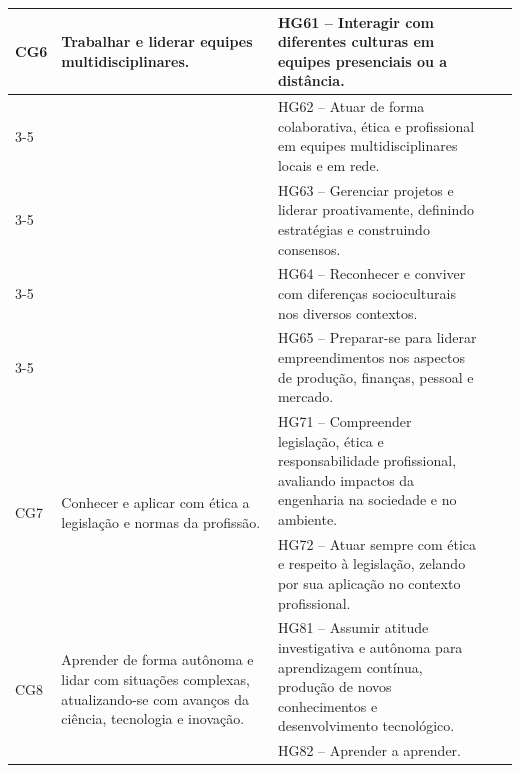 \begin{landscape}
\begin{longtable}{m{1cm} m{5cm} m{8cm} m{5cm} m{5cm}}
		
		\multirow{5}{*}{CG6} &
		\multirow{5}{5cm}{Trabalhar e liderar equipes multidisciplinares.}
		& HG61 – Interagir com diferentes culturas em equipes presenciais ou a distância.
		&
		&
		\\ \cline{3-5}
		
		&
		& HG62 – Atuar de forma colaborativa, ética e profissional em equipes multidisciplinares locais e em rede.
		&
		&
		\\ \cline{3-5}
		
		&
		& HG63 – Gerenciar projetos e liderar proativamente, definindo estratégias e construindo consensos.
		&
		&
		\\ \cline{3-5}
		
		&
		& HG64 – Reconhecer e conviver com diferenças socioculturais nos diversos contextos.
		&
		&
		\\ \cline{3-5}
		
		&
		& HG65 – Preparar-se para liderar empreendimentos nos aspectos de produção, finanças, pessoal e mercado.
		&
		&
		\\ \hline
		
		
		\multirow{2}{*}{CG7} &
		\multirow{2}{5cm}{Conhecer e aplicar com ética a legislação e normas da profissão.}
		& HG71 – Compreender legislação, ética e responsabilidade profissional, avaliando impactos da engenharia na sociedade e no ambiente.
		&
		&
		\\ \cline{3-5}
		
		&
		& HG72 – Atuar sempre com ética e respeito à legislação, zelando por sua aplicação no contexto profissional.
		&
		&
		\\ \hline
		
		
		\multirow{2}{*}{CG8} &
		\multirow{2}{5cm}{Aprender de forma autônoma e lidar com situações complexas, atualizando-se com avanços da ciência, tecnologia e inovação.}
		& HG81 – Assumir atitude investigativa e autônoma para aprendizagem contínua, produção de novos conhecimentos e desenvolvimento tecnológico.
		&
		&
		\\ \cline{3-5}
		
		&
		& HG82 – Aprender a aprender.
		&
		&
		\\ \hline
		
	\end{longtable}
	
\end{landscape}

